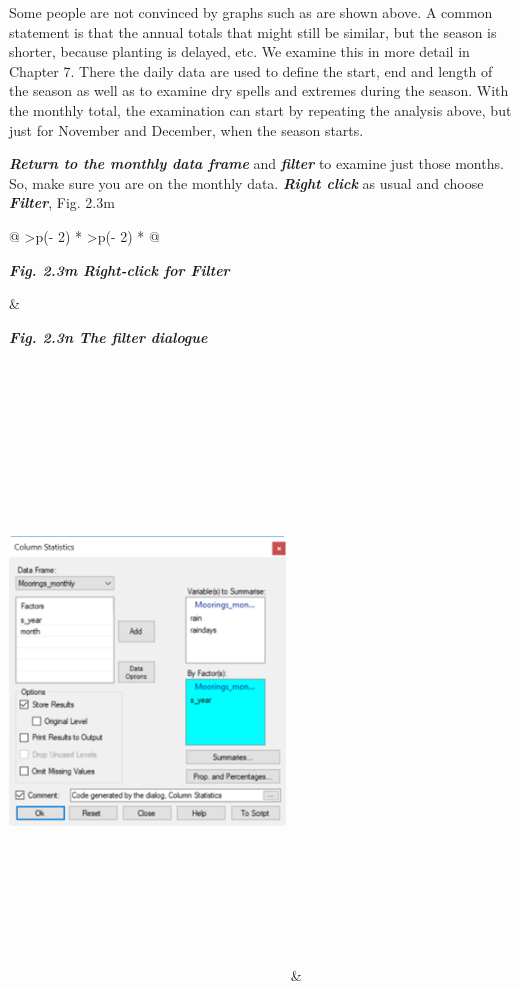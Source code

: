 \documentclass[
  letterpaper,
  DIV=11,
  numbers=noendperiod]{scrreprt}
\begin{document}
Some people are not convinced by graphs such as are shown above. A
common statement is that the annual totals that might still be similar,
but the season is shorter, because planting is delayed, etc. We examine
this in more detail in Chapter 7. There the daily data are used to
define the start, end and length of the season as well as to examine dry
spells and extremes during the season. With the monthly total, the
examination can start by repeating the analysis above, but just for
November and December, when the season starts.

\textbf{\emph{Return to the monthly data frame}} and
\textbf{\emph{filter}} to examine just those months. So, make sure you
are on the monthly data. \textbf{\emph{Right click}} as usual and choose
\textbf{\emph{Filter}}, Fig. 2.3m

\begin{longtable}[]{@{}
  >{\centering\arraybackslash}p{(\columnwidth - 2\tabcolsep) * }
  >{\centering\arraybackslash}p{(\columnwidth - 2\tabcolsep) * }@{}}
\toprule\noalign{}
\begin{minipage}[b]{\linewidth}\centering
\textbf{\emph{Fig. 2.3m Right-click for Filter}}
\end{minipage} & \begin{minipage}[b]{\linewidth}\centering
\textbf{\emph{Fig. 2.3n The filter dialogue}}
\end{minipage} \\
\midrule\noalign{}
\endhead
\bottomrule\noalign{}
\endlastfoot
\includegraphics[width=2.886in,height=6.25in]{figures/Fig2.3c.png} &

\end{longtable}
\end{document}
